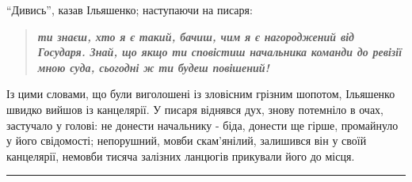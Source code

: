 \documentclass[a4paper,20pt]{report}
\begin{document}
``Дивись'', казав Ільяшенко; наступаючи на писаря:
\begin{quote}
\em\bfseries    
ти знаєш, хто я є такий, бачиш, чим я є нагороджений від Государя. Знай, що якщо ти 
сповістиш начальника команди до ревізії мною суда, сьогодні ж ти будеш повішений!
\end{quote}

Із цими словами, що були виголошені із зловісним грізним шопотом, Ільяшенко
швидко вийшов із канцелярії. У писаря віднявся дух, знову потемніло в очах,
застучало у голові: не донести начальнику - біда, донести ще гірше, промайнуло
у його свідомості; непорушний, мовби скам'янілий, залишився він у своїй
канцелярії, немовби тисяча залізних ланцюгів прикували його до місця.





\par\noindent\rule{\textwidth}{0.4pt}
\end{document}

